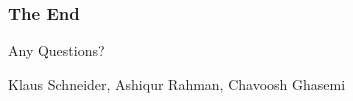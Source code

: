 \begin{frame}
	\frametitle{The End}
	\vspace{2cm}
	{\huge Any Questions?
	}
	\vspace{2.5cm}  
	\begin{flushright}  
		Klaus Schneider, Ashiqur Rahman, Chavoosh Ghasemi \\
	\end{flushright}
\end{frame}
